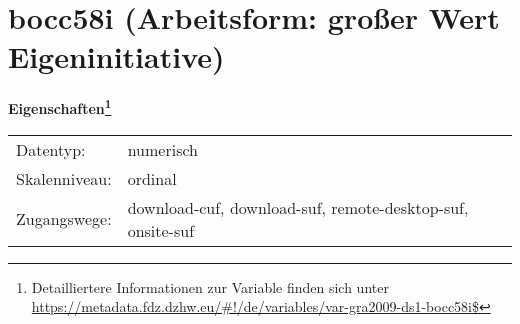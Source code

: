 
    \setcounter{footnote}{0}

    \vspace*{-1.8cm}
	\section{bocc58i (Arbeitsform: großer Wert Eigeninitiative)}
	\label{section:bocc58i}



    \vspace*{0.5cm}
    \noindent\textbf{Eigenschaften\footnote{Detailliertere Informationen zur Variable finden sich unter
		\url{https://metadata.fdz.dzhw.eu/\#!/de/variables/var-gra2009-ds1-bocc58i$}}}\\
	\begin{tabularx}{\hsize}{@{}lX}
	Datentyp: & numerisch \\
	Skalenniveau: & ordinal \\
	Zugangswege: &
	  download-cuf, 
	  download-suf, 
	  remote-desktop-suf, 
	  onsite-suf
 \\
    \end{tabularx}



